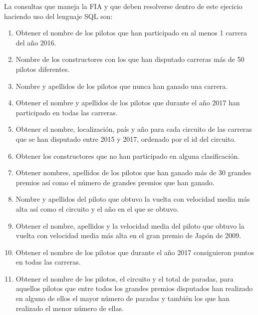 \documentclass[a4paper]{article}
\begin{document}
La consultas que maneja la \ac{FIA} y que deben resolverse dentro de este ejecicio haciendo uso del lenguaje SQL son:

\begin{enumerate}
    \item Obtener el nombre de los pilotos que han participado en al menos 1 carrera del año 2016.

    \item Nombre de los constructores con los que han disputado carreras más de 50 pilotos diferentes.
    
    \item Nombre y apellidos de los pilotos que nunca han ganado una carrera.
              
    \item Obtener el nombre y apellidos de los pilotos que durante el año 2017 han participado en todas las carreras.
    
    \item Obtener el nombre, localización, país y año para cada circuito de las carreras que se han disputado entre 2015 y 2017, ordenado por el id del circuito.
    
    \item Obtener los constructores que no han participado en alguna clasificación.
              
    \item Obtener nombres, apellidos de los pilotos que han ganado más de 30 grandes premios así como el número de grandes premios que han ganado.
       
    \item Nombre y apellidos del piloto que obtuvo la vuelta con velocidad media más alta así como el circuito y el año en el que se obtuvo.
    
    \item Obtener el nombre, apellidos y la velocidad media del piloto que obtuvo la vuelta con velocidad media más alta en el gran premio de Japón de 2009.
             
    \item Obtener el nombre de los pilotos que durante el año 2017 consiguieron puntos en todas las carreras.
    
    \item Obtener el nombre de los pilotos, el circuito y el total de paradas, para aquellos pilotos que entre todos los grandes premios disputados han realizado en alguno de ellos el mayor número de paradas y también los que han realizado el menor número de ellas.
      

\end{enumerate}
\end{document}
